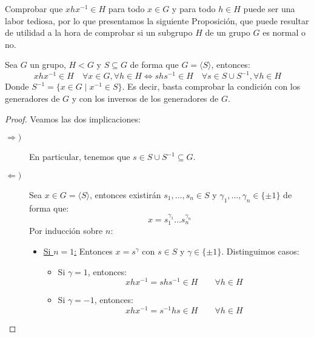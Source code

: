 \noindent
Comprobar que $xhx^{-1}\in H$ para todo $x\in G$ y para todo $h\in H$ puede ser una labor tediosa, por lo que presentamos la siguiente Proposición, que puede resultar de utilidad a la hora de comprobar si un subgrupo $H$ de un grupo $G$ es normal o no.
\begin{prop}\label{prop:normal_generadores}
    Sea $G$ un grupo, $H<G$ y $S\subseteq G$ de forma que $G=\langle S \rangle $, entonces:
    \begin{equation*}
        xhx^{-1}\in H \quad \forall x\in G, \forall h\in H \Longleftrightarrow shs^{-1}\in H \quad \forall s\in S\cup S^{-1}, \forall h\in H
    \end{equation*}
    Donde $S^{-1} = \{x\in G \mid x^{-1}\in S\}$. Es decir, basta comprobar la condición con los generadores de $G$ y con los inversos de los generadores de $G$.
    \begin{proof}
        Veamos las dos implicaciones:
        \begin{description}
            \item [$\Longrightarrow)$] En particular, tenemos que $s\in S\cup S^{-1}\subseteq G$.
            \item [$\Longleftarrow)$] Sea $x\in G=\langle S \rangle $, entonces existirán $s_1,\ldots,s_n\in S$ y $\gamma_1,\ldots,\gamma_n \in \{\pm 1\}$ de forma que:
                \begin{equation*}
                    x = s_1^{\gamma_1}\ldots s_n^{\gamma_n}
                \end{equation*}
                Por inducción sobre $n$:
                \begin{itemize}
                    \item \underline{Si $n=1$:} Entonces $x=s^{\gamma}$ con $s\in S$ y $\gamma\in \{\pm 1\}$. Distinguimos casos:
                        \begin{itemize}
                            \item Si $\gamma=1$, entonces:
                                \begin{equation*}
                                    xhx^{-1} = shs^{-1} \in H \qquad \forall h\in H
                                \end{equation*}
                            \item Si $\gamma=-1$, entonces:
                                \begin{equation*}
                                    xhx^{-1} = s^{-1}hs \in H \qquad \forall h\in H
                                \end{equation*}

\end{itemize}
\end{itemize}
\end{description}
\end{proof}
\end{prop}
